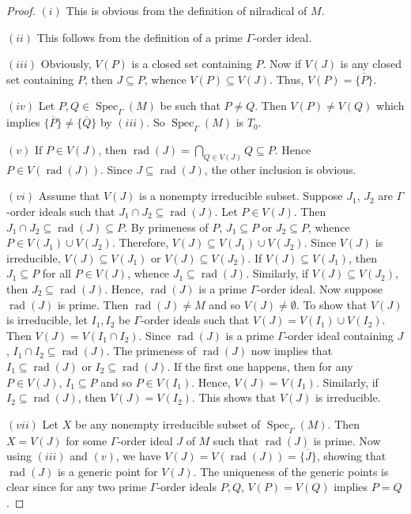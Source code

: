 \documentclass[a4paper,reqno,12pt]{amsart}
\numberwithin{equation}{section}
\theoremstyle{definition}
\theoremstyle{remark}
\newcommand{\rad}{\operatorname{rad}}
\newcommand{\Spec}{\operatorname{Spec}}
\begin{document}
\begin{proof}
$(i)$ This is obvious from the definition of nilradical of $M$. 

$(ii)$ This follows from the definition of a prime $\Gamma$-order ideal.

$(iii)$ Obviously, $V(P)$ is a closed set containing $P$. Now if $V(J)$ is any closed set containing $P$, then $J\subseteq P$, whence $V(P)\subseteq V(J)$. Thus, $V(P)=\overline{\{P\}}$.

$(iv)$ Let $P,Q\in \Spec_\Gamma(M)$ be such that $P\neq Q$. Then $V(P)\neq V(Q)$ which implies $\overline{\{P\}}\neq \overline{\{Q\}}$ by $(iii)$. So $\Spec_\Gamma(M)$ is $T_0$. 

$(v)$ If $P\in V(J)$, then $\rad(J)=\displaystyle{\bigcap_{Q\in V(J)}}Q\subseteq P$. Hence $P\in V(\rad(J))$. Since $J\subseteq \rad(J)$, the other inclusion is obvious. 

$(vi)$ Assume that $V(J)$ is a nonempty irreducible subset. Suppose $J_1$, $J_2$ are $\Gamma$-order ideals such that $J_1\cap J_2\subseteq \rad(J)$. Let $P\in V(J)$. Then $J_1\cap J_2\subseteq \rad(J)\subseteq P$. By primeness of $P$, $J_1\subseteq P$ or $J_2\subseteq P$, whence $P\in V(J_1)\cup V(J_2)$. Therefore, $V(J)\subseteq V(J_1)\cup V(J_2)$. Since $V(J)$ is irreducible, $V(J)\subseteq V(J_1)$ or $V(J)\subseteq V(J_2)$. If $V(J)\subseteq V(J_1)$, then $J_1\subseteq P$ for all $P\in V(J)$, whence $J_1\subseteq \rad(J)$. Similarly, if $V(J)\subseteq V(J_2)$, then $J_2\subseteq \rad(J)$. Hence, $\rad(J)$ is a prime $\Gamma$-order ideal. Now suppose $\rad(J)$ is prime. Then $\rad(J)\neq M$ and so $V(J)\neq \emptyset$. To show that $V(J)$ is irreducible, let $I_1,I_2$ be $\Gamma$-order ideals such that $V(J)=V(I_1)\cup V(I_2)$. Then $V(J)=V(I_1\cap I_2)$. Since $\rad(J)$ is a prime $\Gamma$-order ideal containing $J$, $I_1\cap I_2\subseteq \rad(J)$. The primeness of $\rad(J)$ now implies that $I_1\subseteq \rad(J)$ or $I_2\subseteq \rad(J)$. If the first one happens, then for any $P\in V(J)$, $I_1\subseteq P$ and so $P\in V(I_1)$. Hence, $V(J)=V(I_1)$. Similarly, if $I_2\subseteq \rad(J)$, then $V(J)=V(I_2)$. This shows that $V(J)$ is irreducible.  

$(vii)$ Let $X$ be any nonempty irreducible subset of $\Spec_\Gamma(M)$. Then $X=V(J)$ for some $\Gamma$-order ideal $J$ of $M$ such that $\rad(J)$ is prime. Now using $(iii)$ and $(v)$, we have $V(J)=V(\rad(J))=\overline{\{J\}}$, showing that $\rad(J)$ is a generic point for $V(J)$. The uniqueness of the generic points is clear since for any two prime $\Gamma$-order ideals $P, Q$, $V (P ) = V (Q)$ implies $P = Q$.


\end{proof}
\end{document}
